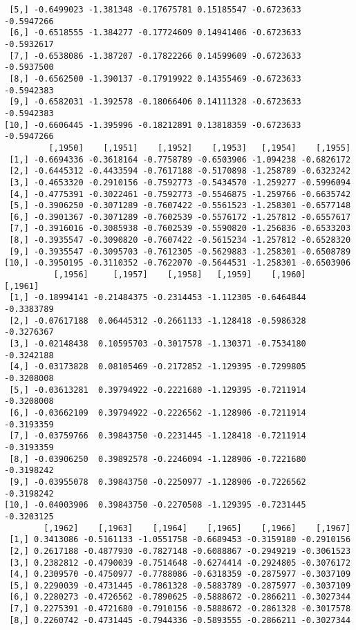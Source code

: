 \documentclass[
  letterpaper,
  DIV=11,
  numbers=noendperiod]{scrreprt}
\begin{document}
\begin{verbatim}
 [5,] -0.6499023 -1.381348 -0.17675781 0.15185547 -0.6723633 -0.5947266
 [6,] -0.6518555 -1.384277 -0.17724609 0.14941406 -0.6723633 -0.5932617
 [7,] -0.6538086 -1.387207 -0.17822266 0.14599609 -0.6723633 -0.5937500
 [8,] -0.6562500 -1.390137 -0.17919922 0.14355469 -0.6723633 -0.5942383
 [9,] -0.6582031 -1.392578 -0.18066406 0.14111328 -0.6723633 -0.5942383
[10,] -0.6606445 -1.395996 -0.18212891 0.13818359 -0.6723633 -0.5947266
         [,1950]    [,1951]    [,1952]    [,1953]   [,1954]    [,1955]
 [1,] -0.6694336 -0.3618164 -0.7758789 -0.6503906 -1.094238 -0.6826172
 [2,] -0.6445312 -0.4433594 -0.7617188 -0.5170898 -1.258789 -0.6323242
 [3,] -0.4653320 -0.2910156 -0.7592773 -0.5434570 -1.259277 -0.5996094
 [4,] -0.4775391 -0.3022461 -0.7592773 -0.5546875 -1.259766 -0.6635742
 [5,] -0.3906250 -0.3071289 -0.7607422 -0.5561523 -1.258301 -0.6577148
 [6,] -0.3901367 -0.3071289 -0.7602539 -0.5576172 -1.257812 -0.6557617
 [7,] -0.3916016 -0.3085938 -0.7602539 -0.5590820 -1.256836 -0.6533203
 [8,] -0.3935547 -0.3090820 -0.7607422 -0.5615234 -1.257812 -0.6528320
 [9,] -0.3935547 -0.3095703 -0.7612305 -0.5629883 -1.258301 -0.6508789
[10,] -0.3950195 -0.3110352 -0.7622070 -0.5644531 -1.258301 -0.6503906
          [,1956]     [,1957]    [,1958]   [,1959]    [,1960]    [,1961]
 [1,] -0.18994141 -0.21484375 -0.2314453 -1.112305 -0.6464844 -0.3383789
 [2,] -0.07617188  0.06445312 -0.2661133 -1.128418 -0.5986328 -0.3276367
 [3,] -0.02148438  0.10595703 -0.3017578 -1.130371 -0.7534180 -0.3242188
 [4,] -0.03173828  0.08105469 -0.2172852 -1.129395 -0.7299805 -0.3208008
 [5,] -0.03613281  0.39794922 -0.2221680 -1.129395 -0.7211914 -0.3208008
 [6,] -0.03662109  0.39794922 -0.2226562 -1.128906 -0.7211914 -0.3193359
 [7,] -0.03759766  0.39843750 -0.2231445 -1.128418 -0.7211914 -0.3193359
 [8,] -0.03906250  0.39892578 -0.2246094 -1.128906 -0.7221680 -0.3198242
 [9,] -0.03955078  0.39843750 -0.2250977 -1.128906 -0.7226562 -0.3198242
[10,] -0.04003906  0.39843750 -0.2270508 -1.129395 -0.7231445 -0.3203125
        [,1962]    [,1963]    [,1964]    [,1965]    [,1966]    [,1967]
 [1,] 0.3413086 -0.5161133 -1.0551758 -0.6689453 -0.3159180 -0.2910156
 [2,] 0.2617188 -0.4877930 -0.7827148 -0.6088867 -0.2949219 -0.3061523
 [3,] 0.2382812 -0.4790039 -0.7514648 -0.6274414 -0.2924805 -0.3076172
 [4,] 0.2309570 -0.4750977 -0.7788086 -0.6318359 -0.2875977 -0.3037109
 [5,] 0.2290039 -0.4731445 -0.7861328 -0.5883789 -0.2875977 -0.3037109
 [6,] 0.2280273 -0.4726562 -0.7890625 -0.5888672 -0.2866211 -0.3027344
 [7,] 0.2275391 -0.4721680 -0.7910156 -0.5888672 -0.2861328 -0.3017578
 [8,] 0.2260742 -0.4731445 -0.7944336 -0.5893555 -0.2866211 -0.3027344

\end{verbatim}
\end{document}
